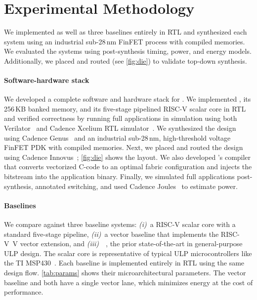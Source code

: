 \section{Experimental Methodology}
\label{snafu:method}

\figSNAFUDie
\tabSNAFUTabs

We implemented \snafuarch as well as three baselines entirely in RTL and synthesized each system using
an industrial sub-28\,nm FinFET process with compiled memories.
% 
We evaluated the systems using post-synthesis timing, power, and energy models.
% 
Additionally, we placed and routed \snafuarch (see \autoref{fig:die}) to validate top-down synthesis.

\paragraph{Software-hardware stack}
We developed a complete software and hardware stack for \snafu.
% 
We implemented \snafuarch, its 256\,KB banked memory, and its five-stage pipelined \mbox{RISC-V} scalar core in RTL and verified correctness by running full applications in simulation using both Verilator~\cite{snyder2004verilator} and Cadence Xcelium RTL simulator~\cite{xcelium}.
% 
We synthesized the design using Cadence Genus~\cite{genus} and an industrial sub-28\,nm, high-threshold voltage FinFET PDK with compiled memories.
% 
Next, we placed and routed the design using Cadence Innovus~\cite{innovus};
% 
\autoref{fig:die} shows the layout.
% 
We also developed \snafuframe's compiler that converts vectorized C-code to an optimal fabric configuration and injects the bitstream into the application binary.
% 
Finally, we simulated full applications post-synthesis, annotated switching, and
used Cadence Joules~\cite{joules} to estimate power.

\paragraph{Baselines}
We compare \snafuarch against three baseline systems:
\emph{(i)}~a RISC-V scalar core with a standard five-stage pipeline,
\emph{(ii)}~a vector baseline that implements the \mbox{RISC-V V} vector extension,
and \emph{(iii)}~\manic~\cite{manic}, the prior state-of-the-art in general-purpose ULP design.
%
The scalar core is representative of typical ULP microcontrollers like the TI MSP430~\cite{msp430fr5994}.
% 
Each baseline is implemented entirely in RTL using the same design flow. 
%
\autoref{tab:params} shows their microarchitectural parameters.
%
The vector baseline and \manic both have a single vector lane, which minimizes energy at the cost of performance.


